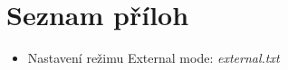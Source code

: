 \chapter{Seznam příloh}
\vspace{7mm}
\begin{itemize}
\item Nastavení režimu External mode: \textit{external.txt}

\end{itemize}

